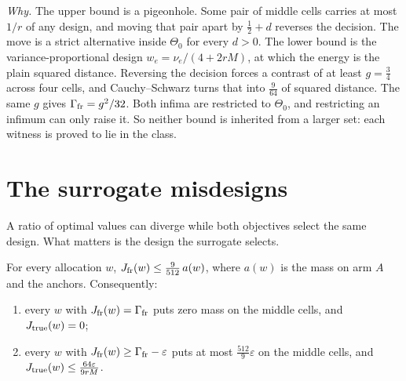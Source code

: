 
\emph{Why.} The upper bound is a pigeonhole. Some pair of middle cells carries at most $1/r$
of any design, and moving that pair apart by $\frac12+d$ reverses the decision. The move is a
strict alternative inside $\Theta_{0}$ for every $d>0$. The lower bound is the
variance-proportional design $w_{e}=\nu_{e}/(4+2rM)$, at which the energy is the plain squared
distance. Reversing the decision forces a contrast of at least $g=\frac34$ across four cells,
and Cauchy--Schwarz turns that into $\frac{9}{64}$ of squared distance. The same $g$ gives
$\Gamma_{\rm fr}=g^{2}/32$. Both infima are restricted to $\Theta_{0}$, and restricting an
infimum can only raise it. So neither bound is inherited from a larger set: each witness is
proved to lie in the class.

\section{The surrogate misdesigns}
\label{sec:starve}

A ratio of optimal values can diverge while both objectives select the same design. What
matters is the design the surrogate selects.

\begin{theorem}[Starvation]
\label{thm:starve}
For every allocation $w$, $J_{\rm fr}(w)\le\frac{9}{512}\,a(w)$, where $a(w)$ is the mass on
arm $A$ and the anchors. Consequently:
\begin{enumerate}
\item[(i)] every $w$ with $J_{\rm fr}(w)=\Gamma_{\rm fr}$ puts zero mass on the middle cells,
and $J_{\rm true}(w)=0$;
\item[(ii)] every $w$ with $J_{\rm fr}(w)\ge\Gamma_{\rm fr}-\varepsilon$ puts at most
$\frac{512}{9}\varepsilon$ on the middle cells, and $J_{\rm true}(w)\le\frac{64\varepsilon}{9rM}$.
\end{enumerate}
\end{theorem}


